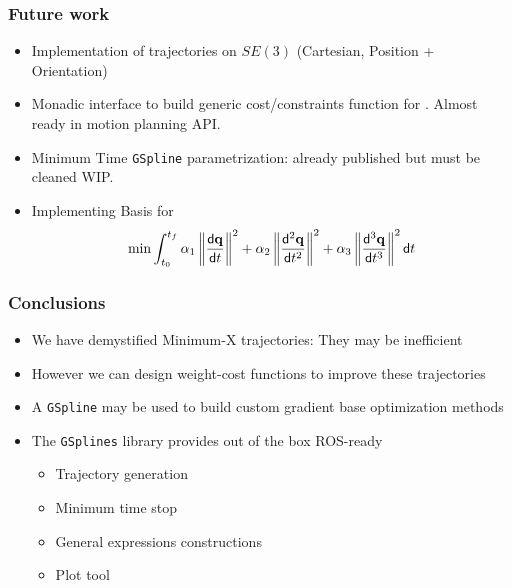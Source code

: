 \begin{frame}[t]
	\frametitle{Future work}

	\begin{itemize}
		\item Implementation of trajectories on $SE(3)$ (Cartesian, Position + Orientation)
		\item Monadic interface to build generic cost/constraints function for .
		      Almost ready in  motion planning API.
		\item Minimum Time \Verb|GSpline| parametrization: already published but must be cleaned WIP.
		\item Implementing Basis for
		      \begin{eqnarray*}
			      \min \int_{t_0}^{t_f} \alpha_1 \left\|\frac{\mathsf{d} \mathbf{q}}{\mathsf{d} t}\right\|^2 + \alpha_2 \left\|\frac{\mathsf{d}^{2} \mathbf{q}}{\mathsf{d} t^{2}}\right\|^2 +  \alpha_3 \left\|\frac{\mathsf{d}^{3} \mathbf{q}}{\mathsf{d} t^{3}} \right\|^2 \mathsf{d} t
		      \end{eqnarray*}
	\end{itemize}
\end{frame}

\begin{frame}[t]
	\frametitle{Conclusions}

	\begin{itemize}
		\item We have demystified Minimum-X trajectories: They may be inefficient
		\item However we can design weight-cost functions to improve these trajectories
		\item A \Verb|GSpline| may be used to build custom gradient base optimization methods
		\item The \Verb|GSplines| library provides out of the box ROS-ready
		      \begin{itemize}
			      \item Trajectory generation
			      \item Minimum time stop
			      \item General expressions constructions
			      \item Plot tool
		      \end{itemize}
	\end{itemize}
\end{frame}
